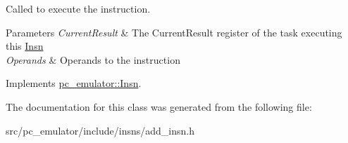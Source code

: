 Called to execute the instruction. 


\begin{DoxyParams}{Parameters}
{\em Current\+Result} & The Current\+Result register of the task executing this \hyperlink{classpc__emulator_1_1Insn}{Insn} \\
\hline
{\em Operands} & Operands to the instruction \\
\hline
\end{DoxyParams}


Implements \hyperlink{classpc__emulator_1_1Insn_a103d27030e872a799e313df16c1f3d66}{pc\+\_\+emulator\+::\+Insn}.



The documentation for this class was generated from the following file\+:\begin{DoxyCompactItemize}
\item 
src/pc\+\_\+emulator/include/insns/add\+\_\+insn.\+h\end{DoxyCompactItemize}
